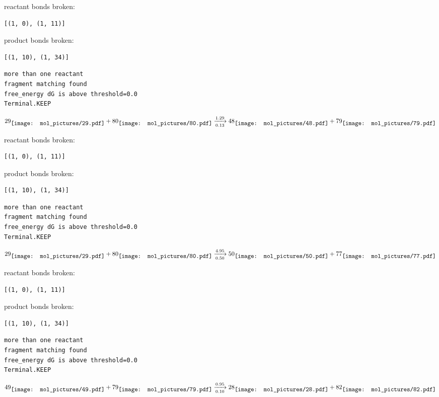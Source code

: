 \documentclass{article}
\begin{document}
reactant bonds broken:\begin{verbatim}
[(1, 0), (1, 11)]
\end{verbatim}
product bonds broken:\begin{verbatim}
[(1, 10), (1, 34)]
\end{verbatim}




\vspace{1cm}
\begin{verbatim}
more than one reactant
fragment matching found
free_energy dG is above threshold=0.0
Terminal.KEEP
\end{verbatim}
$$
29
\raisebox{-.5\height}{\texttt{[image: mol\_pictures/29.pdf]}}
+
80
\raisebox{-.5\height}{\texttt{[image: mol\_pictures/80.pdf]}}
\xrightarrow[0.13]{1.29}
48
\raisebox{-.5\height}{\texttt{[image: mol\_pictures/48.pdf]}}
+
79
\raisebox{-.5\height}{\texttt{[image: mol\_pictures/79.pdf]}}
$$


reactant bonds broken:\begin{verbatim}
[(1, 0), (1, 11)]
\end{verbatim}
product bonds broken:\begin{verbatim}
[(1, 10), (1, 34)]
\end{verbatim}




\vspace{1cm}
\begin{verbatim}
more than one reactant
fragment matching found
free_energy dG is above threshold=0.0
Terminal.KEEP
\end{verbatim}
$$
29
\raisebox{-.5\height}{\texttt{[image: mol\_pictures/29.pdf]}}
+
80
\raisebox{-.5\height}{\texttt{[image: mol\_pictures/80.pdf]}}
\xrightarrow[0.50]{4.95}
50
\raisebox{-.5\height}{\texttt{[image: mol\_pictures/50.pdf]}}
+
77
\raisebox{-.5\height}{\texttt{[image: mol\_pictures/77.pdf]}}
$$


reactant bonds broken:\begin{verbatim}
[(1, 0), (1, 11)]
\end{verbatim}
product bonds broken:\begin{verbatim}
[(1, 10), (1, 34)]
\end{verbatim}




\vspace{1cm}
\begin{verbatim}
more than one reactant
fragment matching found
free_energy dG is above threshold=0.0
Terminal.KEEP
\end{verbatim}
$$
49
\raisebox{-.5\height}{\texttt{[image: mol\_pictures/49.pdf]}}
+
79
\raisebox{-.5\height}{\texttt{[image: mol\_pictures/79.pdf]}}
\xrightarrow[0.10]{0.95}
28
\raisebox{-.5\height}{\texttt{[image: mol\_pictures/28.pdf]}}
+
82
\raisebox{-.5\height}{\texttt{[image: mol\_pictures/82.pdf]}}
$$
\end{document}
